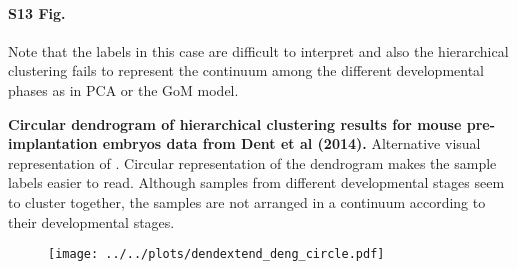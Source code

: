 \documentclass[10pt,letterpaper]{article}
\begin{document}
\paragraph*{S13 Fig.}

\label{figS13}
Note that the labels in this case are difficult to interpret and also the hierarchical
clustering fails to represent the continuum among the different developmental
phases as in PCA or the GoM model.

{\bf Circular dendrogram of hierarchical clustering results for mouse pre-implantation embryos data from Dent et al (2014).} Alternative visual representation of . Circular representation of the dendrogram makes the sample labels easier to read. Although samples from different developmental stages seem to cluster together, the samples are not arranged in a continuum according to their developmental stages.
\begin{figure}[ht]
\centering
\texttt{[image: ../../plots/dendextend\_deng\_circle.pdf]}
\end{figure}
\end{document}
